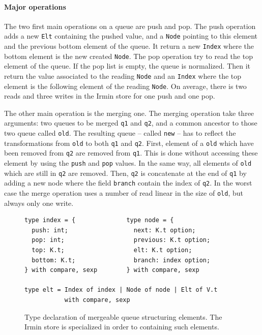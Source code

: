 \documentclass{article}
\renewcommand{\-}{\hyp}
\newcommand{\irmin}{Irmin\xspace}
\newcommand{\code}[1]{\texttt{#1}}
\begin{document}
\paragraph{Major operations}
The two first main operations on a queue are push and pop.
The push operation adds a new \code{Elt} containing the pushed value, and a \code{Node} pointing to this element and the previous bottom element of the queue.
It return a new \code{Index} where the bottom element is the new created \code{Node}.
The pop operation try to read the top element of the queue.
If the pop list is empty, the queue is normalized.
Then it return the value associated to the reading \code{Node} and an \code{Index} where the top element is the following element of the reading \code{Node}.
On average, there is two reads and three writes in the \irmin store for one push and one pop.

The other main operation is the merging one.
The merging operation take three arguments: two queues to be merged \code{q1} and \code{q2}, and a common ancestor to those two queue called \code{old}.
The resulting queue -- called \code{new} -- has to reflect the transformations from \code{old} to both \code{q1} and \code{q2}. First, element of a \code{old} which have been removed from \code{q2} are removed from \code{q1}. This is done without accessing these element by using the \code{push} and \code{pop} values. In the same way, all elements of \code{old} which are still in \code{q2} are removed. Then, \code{q2} is concatenate at the end of \code{q1} by adding a new node where the field \code{branch} contain the index of \code{q2}. In the worst case the merge operation uses a number of read linear in the size of \code{old}, but always only one write.

\begin{figure}[hbt]
\begin{lstlisting}
type index = {              type node = {
  push: int;                  next: K.t option;
  pop: int;                   previous: K.t option;
  top: K.t;                   elt: K.t option;
  bottom: K.t;                branch: index option;
} with compare, sexp        } with compare, sexp

type elt = Index of index | Node of node | Elt of V.t
           with compare, sexp
\end{lstlisting}
\caption{Type declaration of mergeable queue structuring elements. The \irmin store is specialized in order to containing such elements.}
\label{queue}
\end{figure}
\end{document}
